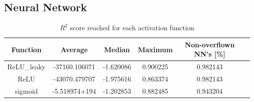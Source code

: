 \documentclass[a4paper, UKenglish]{article}
\newcommand{\0}{\mathbf{0}}
\newcommand{\1}{\mathbf{1}}
\begin{document}
\subsection{Neural Network} \label{sec:NN results}
\begin{table}[H] 
\centering
\caption{$R^2$ score reached for each activation function}
\label{tab:activation functions}
\begin{tabular}{|c|c|c|c|c|c|}
  \hline
  Function & Average & Median & Maximum & Non-overflown NN's [\%] \\
  \hline
  ReLU\_leaky &-37160.106071 & -1.620086 & 0.900225 & 0.982143 \\
  ReLU        &-43070.479707 & -1.975616 & 0.863374 & 0.982143 \\
  sigmoid     &-5.518974+194 & -1.202853 & 0.882485 & 0.943204 \\
  \hline
\end{tabular}
\end{table}
\end{document}
